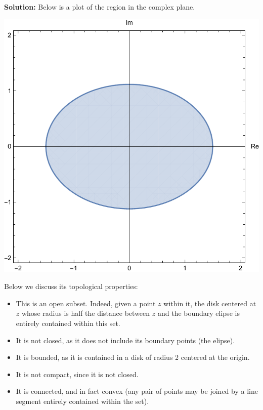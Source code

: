 \documentclass[12pt,oneside]{exam}
\begin{document}
\textbf{Solution:} Below is a plot of the region in the complex plane.
\begin{center}
\includegraphics[scale=0.5]{p1.pdf}  
\end{center}

Below we discuss its topological properties:
\begin{itemize}
\item This is an open subset. Indeed, given a point $z$ within it, the disk centered at $z$ whose radius is half the distance between $z$ and the boundary elipse is  entirely contained within this set.
\item It is not closed, as it does not include its boundary points (the elipse).
\item It is bounded, as it is contained in a disk of radius 2 centered at the origin.
\item It is not compact, since it is not closed.
\item It is connected, and in fact convex (any pair of points may be joined by a line segment entirely contained within the set).
\end{itemize}
      
\end{document}
